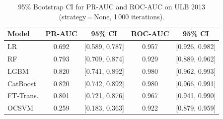 \begin{table}[ht!]
\centering
\caption{95\% Bootstrap CI for PR-AUC and ROC-AUC on ULB 2013 (strategy\,=\,None, 1\,000 iterations).}
\label{tab:ci_ulb}
\begin{tabular}{l c c c c}
\toprule
Model & PR-AUC & 95\% CI & ROC-AUC & 95\% CI \\
\midrule
LR         & 0.692 & [0.589, 0.787] & 0.957 & [0.926, 0.982] \\
RF         & 0.793 & [0.709, 0.874] & 0.929 & [0.889, 0.962] \\
LGBM       & 0.820 & [0.741, 0.892] & 0.980 & [0.962, 0.993] \\
CatBoost   & 0.820 & [0.742, 0.892] & 0.980 & [0.966, 0.991] \\
FT-Trans.  & 0.801 & [0.721, 0.876] & 0.967 & [0.941, 0.990] \\
OCSVM      & 0.259 & [0.183, 0.363] & 0.922 & [0.879, 0.959] \\
\bottomrule
\end{tabular}
\end{table}